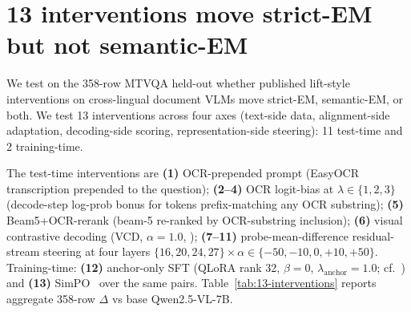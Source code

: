 \section{13 interventions move strict-EM but not semantic-EM}
\label{sec:interventions}

We test on the 358-row MTVQA held-out whether published lift-style interventions on cross-lingual document VLMs move strict-EM, semantic-EM, or both. We test 13 interventions across four axes (text-side data, alignment-side adaptation, decoding-side scoring, representation-side steering): 11 test-time and 2 training-time.

The test-time interventions are \textbf{(1)} OCR-prepended prompt (EasyOCR transcription prepended to the question); \textbf{(2--4)} OCR logit-bias at $\lambda \in \{1,2,3\}$ (decode-step log-prob bonus for tokens prefix-matching any OCR substring); \textbf{(5)} Beam5+OCR-rerank (beam-5 re-ranked by OCR-substring inclusion); \textbf{(6)} visual contrastive decoding (VCD, $\alpha=1.0$, \citealp{leng2024vcd}); \textbf{(7--11)} probe-mean-difference residual-stream steering at four layers $\{16,20,24,27\} \times \alpha \in \{-50, -10, 0, +10, +50\}$. Training-time: \textbf{(12)} anchor-only SFT (QLoRA rank 32, $\beta=0$, $\lambda_{\text{anchor}}=1.0$; cf.~\citealp{rafailov2023dpo}) and \textbf{(13)} SimPO~\citep{meng2024simpo} over the same pairs. Table~\ref{tab:13-interventions} reports aggregate 358-row $\Delta$ vs base Qwen2.5-VL-7B.

